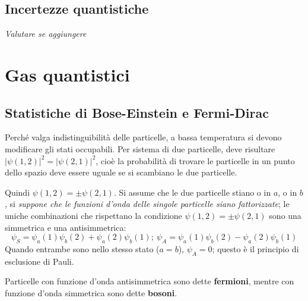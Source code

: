 \documentclass[10pt, a4paper]{scrartcl}
\numberwithin{equation}{subsection}
\theoremstyle{style1}
\theoremstyle{style2}
\newenvironment{boxenv}[1][]{
    \begin{eqbox}[#1]
    }{
   \end{eqbox}
}
\begin{document}
\subsection{Incertezze quantistiche}
\begin{boxenv}[]
	\centering \textit{Valutare se aggiungere} 
\end{boxenv}






















\newpage
\section{Gas quantistici}
\subsection{Statistiche di Bose-Einstein e Fermi-Dirac}
Perch\'e valga indistinguibilit\`a delle particelle, a bassa temperatura si devono modificare gli stati occupabili. Per sistema di due particelle, deve risultare $\lvert \psi (1,2) \rvert ^2 = \lvert \psi (2,1) \rvert ^2$, cio\`e la probabilit\`a di trovare le particelle in un punto dello spazio deve essere uguale se si scambiano le due particelle.

Quindi $\psi (1,2) = \pm \psi (2,1)$. Si assume che le due particelle stiano o in $a$, o in $b$, si \textit{suppone che le funzioni d'onda delle singole particelle siano fattorizzate}; le uniche combinazioni che rispettano la condizione $\psi (1,2) = \pm \psi (2,1)$ sono una simmetrica e una antisimmetrica:
\begin{equation}
		\psi _S = \psi _a (1) \psi _b (2) + \psi _a(2) \psi _b(1); \ \psi _A = \psi _a(1) \psi _b(2) - \psi _a(2) \psi _b(1)
\end{equation}
Quando entrambe sono nello stesso stato ($a=b$), $\psi _A = 0 $; questo \`e il principio di esclusione di Pauli. 

Particelle con funzione d'onda antisimmetrica sono dette \textbf{fermioni}, mentre con funzione d'onda simmetrica sono dette \textbf{bosoni}.
\end{document}
